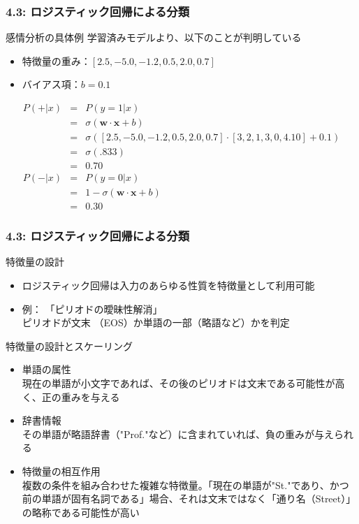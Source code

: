 \documentclass[unicode,11pt]{beamer} %
\begin{document}
\begin{frame}
    \frametitle{4.3: ロジスティック回帰による分類}
    \begin{exampleblock}{感情分析の具体例}
        学習済みモデルより、以下のことが判明している
        \begin{itemize}
            \item 特徴量の重み：$[2.5, -5.0, -1.2, 0.5, 2.0, 0.7]$
            \item バイアス項：$b=0.1$
        \end{itemize}
        \begin{eqnarray*}
            P(+|x) &=& P(y=1|x) \\
                   &=& \sigma(\boldsymbol{w} \cdot \boldsymbol{x} + b) \\
                   &=& \sigma([2.5, -5.0, -1.2, 0.5, 2.0, 0.7] \cdot [3, 2, 1, 3, 0, 4.10] + 0.1) \\
                   &=& \sigma(.833) \\
                   &=& 0.70 \\
            P(-|x) &=& P(y=0|x) \\
                   &=& 1 - \sigma(\boldsymbol{w} \cdot \boldsymbol{x} + b) \\
                   &=& 0.30
        \end{eqnarray*}
    \end{exampleblock}
\end{frame}

\begin{frame}
    \frametitle{4.3: ロジスティック回帰による分類}
    \begin{alertblock}{特徴量の設計}
        \begin{itemize}
            \item ロジスティック回帰は入力のあらゆる性質を特徴量として利用可能
            \item 例： 「ピリオドの曖昧性解消」\\ピリオドが文末 （EOS）か単語の一部（略語など）かを判定
        \end{itemize}
    \end{alertblock}
    \begin{alertblock}{特徴量の設計とスケーリング}
        \begin{itemize}
            \item 単語の属性\\現在の単語が小文字であれば、その後のピリオドは文末である可能性が高く、正の重みを与える
            \item 辞書情報\\その単語が略語辞書（"Prof."など）に含まれていれば、負の重みが与えられる
            \item 特徴量の相互作用\\複数の条件を組み合わせた複雑な特徴量。「現在の単語が"St."であり、かつ前の単語が固有名詞である」場合、それは文末ではなく「通り名（Street）」の略称である可能性が高い
        \end{itemize}
    \end{alertblock}
\end{frame}
\end{document}
